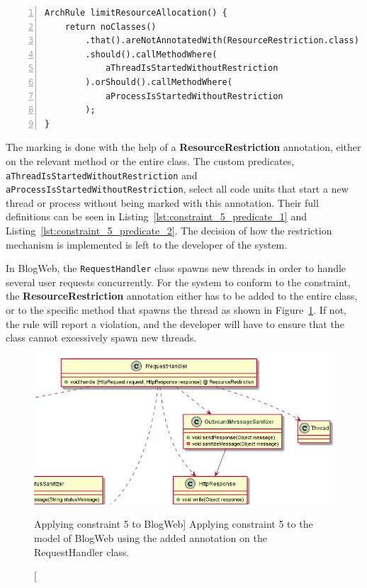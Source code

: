 \begin{minipage}{\linewidth}
\begin{lstlisting}[caption={Rule definition for constraint 5.}, captionpos=b, label=lst:constraint_5_impl, numbers=left]
ArchRule limitResourceAllocation() {
    return noClasses()
        .that().areNotAnnotatedWith(ResourceRestriction.class)
        .should().callMethodWhere(
            aThreadIsStartedWithoutRestriction
        ).orShould().callMethodWhere(
            aProcessIsStartedWithoutRestriction
        );
}
\end{lstlisting}
\end{minipage}

The marking is done with the help of a \textbf{ResourceRestriction} annotation, either on the relevant method or the entire class. The custom predicates, \texttt{aThreadIsStarted\-WithoutRestriction} and \texttt{aProcessIsStartedWithoutRestriction}, select all code units that start a new thread or process without being marked with this annotation. Their full definitions can be seen in Listing~\ref{lst:constraint_5_predicate_1} and Listing~\ref{lst:constraint_5_predicate_2}. The decision of how the restriction mechanism is implemented is left to the developer of the system.

In BlogWeb, the \texttt{RequestHandler} class spawns new threads in order to handle several user requests concurrently. For the system to conform to the constraint, the \textbf{ResourceRestriction} annotation either has to be added to the entire class, or to the specific method that spawns the thread as shown in Figure~\ref{fig:toy_resource_restriction}. If not, the rule will report a violation, and the developer will have to ensure that the class cannot excessively spawn new threads.

\begin{figure}
    \centering
    \includegraphics[width=\linewidth]{figure/toyexamples/resource_restriction.png}
    \caption
        [Applying constraint 5 to BlogWeb]
        {Applying constraint 5 to the model of BlogWeb using the added annotation on the RequestHandler class.}
    \label{fig:toy_resource_restriction}
\end{figure}




